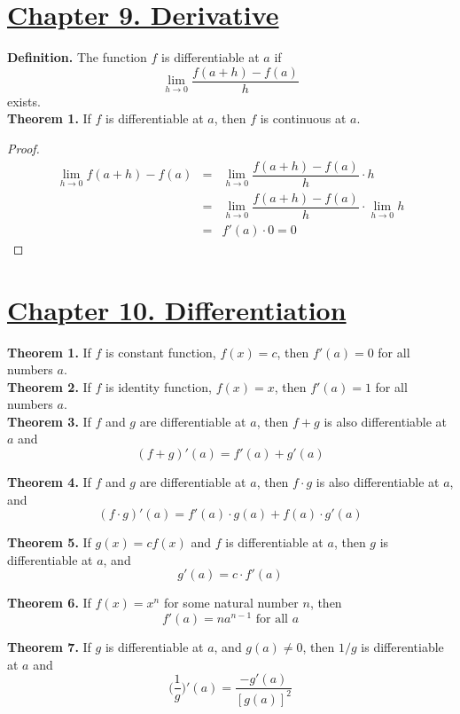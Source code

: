 \documentclass[10pt,letterpaper]{article}
\begin{document}
	\section*{{\color{red}\underline{Chapter 9. Derivative}}}
	\textbf{Definition. } The function $f$ is differentiable at $a$ if 
	$$\displaystyle\lim_{h\to 0}\dfrac{f(a+h) - f(a)}{h}$$
	exists. \\
	
	\textbf{Theorem 1.} If $f$ is differentiable at $a$, then $f$ is continuous at $a$. 
	\begin{proof}
		\begin{eqnarray*}
	\displaystyle\lim_{h\to 0} f(a + h) - f(a) &=& \displaystyle\lim_{h\to 0}
\dfrac{f(a + h) - f(a)}{h} \cdot h \\
	&=& \displaystyle\lim_{h\to 0} \dfrac{f(a + h) - f(a)}{h} \cdot \displaystyle\lim_{h\to 0}  h \\
	&=& f'(a) \cdot 0 = 0
		\end{eqnarray*}			
	\end{proof}		
	
	\section*{{\color{red}\underline{Chapter 10. Differentiation}}}
	\textbf{Theorem 1. } If $f$ is constant function, $f(x) = c$, then $f'(a) = 0$ for all numbers $a$. \\
	
	\textbf{Theorem 2. } If $f$ is identity function, $f(x) = x$, then 
	$f'(a) = 1$ for all numbers $a$. \\
	
	\textbf{Theorem 3. } If $f$ and $g$ are differentiable at $a$, then $f + g$ is also
	differentiable at $a$ and 
		$$(f + g)'(a) = f'(a) + g'(a)$$
	
	\textbf{Theorem 4. } If $f$ and $g$ are differentiable at $a$, then $f \cdot g$ is also
	differentiable at $a$, and
	$$(f \cdot g)'(a) = f'(a) \cdot g(a) + f(a) \cdot g'(a)$$
	
	
	\textbf{Theorem 5. } If $g(x) = cf(x)$ and $f$ is differentiable at $a$, then $g$ is differentiable at $a$,
	and 
	$$g'(a) = c \cdot f'(a)$$
	
	
	\textbf{Theorem 6. } If $f(x) = x^n$ for some natural number $n$, then
	$$f'(a) = na^{n-1} \text{ for all } a $$
	
	\textbf{Theorem 7. } If $g$ is differentiable at $a$, and $g(a) \neq 0$, then $1/g$
	is differentiable at $a$ and 
	$$\bigg(\dfrac{1}{g}\bigg)'(a) = \dfrac{-g'(a)}{[g(a)]^2}$$
	
\end{document}

